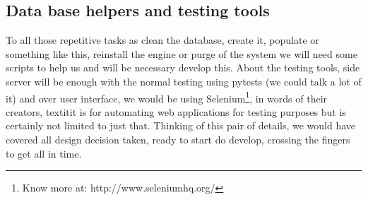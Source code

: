 \subsection{Data base helpers and testing tools}

To all those repetitive tasks as clean the database, create it, populate or
something like this, reinstall the engine or purge of the system we will need
some scripts to help us and will be necessary develop this.
\intro
About the testing tools, side server will be enough with the normal testing using
pytests (we could talk a lot of it) and over user interface, we would be using
Selenium\footnote{Know more at: http://www.seleniumhq.org/},
in words of their creators, textit{it is for automating web applications for
testing purposes but is certainly not limited to just that}.
\intro
Thinking of this pair of details, we would have covered all design decision taken,
ready to start do develop, crossing the fingers to get all in time.
